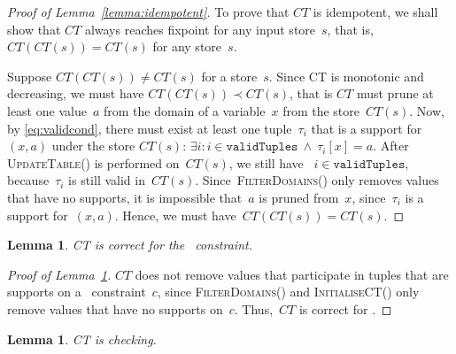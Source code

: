 \documentclass[a4paper,11pt]{article}
\newtheorem{lemma}[theorem]{Lemma}
\newcommand{\Table}{\Constraint{Table}}
\newcommand{\Lemmaref}[1]{Lemma~\ref{#1}}
\newcommand{\Eqref}[1]{\eqref{#1}}
\newcommand{\CurrTable}{\texttt{validTuples}}
\def\UpdateTable{\textsc{UpdateTable}}
\def\FilterDomains{\textsc{FilterDomains}}
\def\InitialiseCT{\textsc{InitialiseCT}}
\numberwithin{equation}{section}
\begin{document}
\begin{proof}[Proof of \Lemmaref{lemma:idempotent}]
  To prove that $CT$ is idempotent, we shall show that $CT$ always reaches
  fixpoint for any input store~$s$, that is, $CT(CT(s)) = CT(s)$ for any
  store~$s$.

  Suppose $CT(CT(s)) \neq CT(s)$ for a store~$s$. 
  Since CT is monotonic
  and decreasing, we must have $CT(CT(s)) \prec CT(s)$, that is $CT$
  must prune at least one value~$a$ from the domain of a variable~$x$
  from the store~$CT(s)$. 
  Now, by \Eqref{eq:validcond}, there must exist at least one 
  tuple~$\tau_i$
  that is a support for~$(x,a)$ under the store $CT(s)$: 
  $\exists i: i \in \CurrTable \ \land \ \tau_i[x] = a$.
  After \UpdateTable() is performed on~$CT(s)$, we still have
  ~$i \in \CurrTable$, because~$\tau_i$ is still valid in~$CT(s)$.
  Since~\FilterDomains() only removes values that have no supports,
  it is impossible that~$a$ is pruned from~$x$, since~$\tau_i$ is a
  support for~$(x,a)$. Hence, we must have~$CT(CT(s)) = CT(s)$.
\end{proof}


\begin{lemma}\label{lemma:correct}
  CT is correct for the \Table~constraint.
\end{lemma}

\begin{proof}[Proof of \Lemmaref{lemma:correct}]
  $CT$ does not remove values that participate in tuples that are supports
  on a \Table~constraint~$c$,
  since \FilterDomains() and \InitialiseCT() only remove values that 
  have no supports on~$c$. Thus,~$CT$ is correct for \Table.
\end{proof}

\begin{lemma}\label{lemma:checking}
  CT is checking.
\end{lemma}
\end{document}
